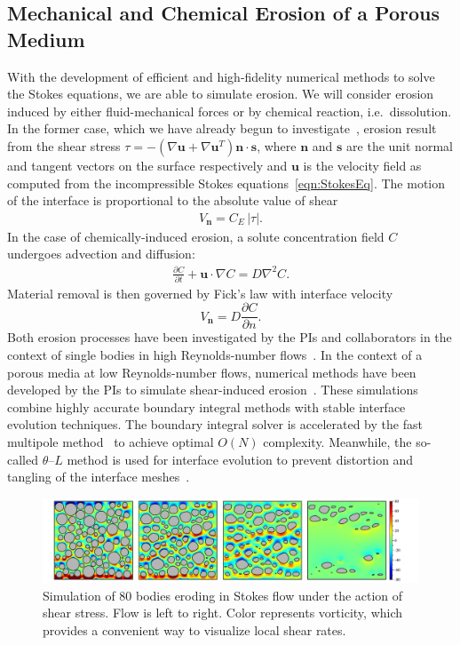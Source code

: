 \documentclass[11pt]{article}
\newcommand{\pd}[2]{ \frac{ \partial #1}{ \partial #2 } }
\newcommand{\bvec}[1]{{\mathbf{#1}}}
\newcommand{\grad}{\nabla}
\newcommand {\Lap} {\grad^2}
\newcommand{\abs}[1]{\left| #1 \right|}
\newcommand{\uu}{\bvec{u}}
\newcommand{\nn}{{\mathbf{n}}}
\renewcommand{\ss}{{\mathbf{s}}}
\newcommand{\Vn}{V_\nn}
\newcommand{\CE}{C_E}
\newcommand {\ny}{n}
\newcommand{\Diff}{D}
\newcommand{\thL}{$\theta$--$L$}
\begin{document}
\subsection{Mechanical and Chemical Erosion of a Porous Medium}
With the development of efficient and high-fidelity numerical methods to solve the Stokes equations, we are able to simulate erosion. We will consider erosion induced by either fluid-mechanical forces or by chemical reaction, i.e.~dissolution. In the former case, which we have already begun to investigate~\cite{Quaife2018}, erosion result from the shear stress $\tau = -\left(\nabla \uu + \nabla \uu^T \right)\nn \cdot \ss$, where $\nn$ and $\ss$ are the unit normal and tangent vectors on the surface respectively and $\uu$ is the velocity field as computed from the incompressible Stokes equations~\eqref{eqn:StokesEq}. The motion of the interface is proportional to the absolute value of shear 
\begin{align}
  \Vn = \CE \, \abs{\tau}.
\end{align}
In the case of chemically-induced erosion, a solute concentration field $C$ undergoes advection and diffusion:
\begin{align}
  \label{Ceq}
  \pd{C}{t} + \uu \cdot \grad C = \Diff \Lap C.
\end{align}
Material removal is then governed by Fick's law with interface velocity
\begin{equation}
\label{DissVn}
\Vn = \Diff \pd{C}{\ny}.
\end{equation}
Both erosion processes have been investigated by the PIs and collaborators in the context of single bodies in high Reynolds-number flows~\cite{Ristroph2012, MoorePOF2013, HuangJFM2015, MooreCPAM2017}. In the context of a porous media at low Reynolds-number flows, numerical methods have been developed by the PIs to simulate shear-induced erosion~\cite{Quaife2018, chi-moo-qua2019}. These simulations combine highly accurate boundary integral methods with stable interface evolution techniques.  The boundary integral solver is accelerated by the fast multipole method~\cite{gre-rok1987, gre-gre-may1992} to achieve optimal $O(N)$ complexity. Meanwhile, the so-called {\thL} method is used for interface evolution to prevent distortion and tangling of the interface meshes~\cite{hou1994removing, MoorePOF2013, Quaife2018}.

\begin{figure}[htp]
\begin{center}
\includegraphics[width = 0.99 \textwidth]{./figs/80circ8vort.pdf}
\caption{\label{80circ8vort} Simulation of 80 bodies eroding in Stokes flow under the action of shear stress. Flow is left to right. Color represents vorticity, which provides a convenient way to visualize local shear rates. 
}
\end{center}
\end{figure}
 
\end{document}
